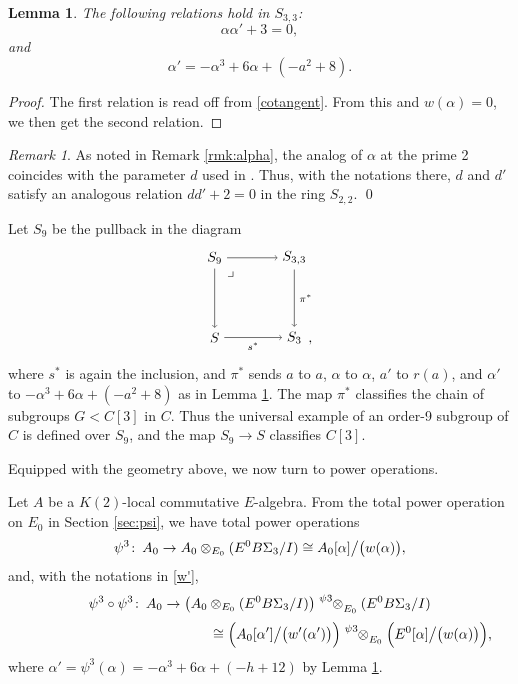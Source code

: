 \documentclass{gtpart}
\newtheorem{lem}[thm]{Lemma}
\theoremstyle{definition}
\theoremstyle{remark}
\newtheorem{rmk}[thm]{Remark}
\def\co{\colon\thinspace}
\newcommand{\A}{\alpha}
\newcommand{\p}{\psi^3}
\begin{document}
\begin{lem}
\label{lem:-p}
 The following relations hold in $S_{3,3}$: 
 \[
  \A \A' + 3 = 0, 
 \]
 and 
 \[
  \A' = -\A^3 + 6 \A + (-a^2 + 8).  
 \]
\end{lem}
\begin{proof}
 The first relation is read off from \eqref{cotangent}.  From this and $w(\A) = 0$, we then get the second relation.  
\end{proof}
\begin{rmk}
 As noted in Remark \ref{rmk:alpha}, the analog of $\A$ at the prime 2 coincides with the parameter $d$ used in \cite[Section 3]{h2p2}.  
 Thus, with the notations there, $d$ and $d'$ satisfy an analogous relation $d d' + 2 = 0$ in the ring $S_{2,2}$.  
\qed
\end{rmk}

Let $S_9$ be the pullback in the diagram 
\begin{equation}
\label{S9}
 \begin{tikzpicture}[baseline=(current bounding box.center)]
         \node (LT) at (0, 2) {$S_9$}; 
         \node (RT) at (2, 2) {$S_{3,3}$}; 
         \node (LB) at (0, 0) {$S$}; 
         \node (RB) at (2, 0) {$S_3$}; 
         \node at (2.4, -0.125) {,}; 
         \node at (0.4, 1.6) {$\lrcorner$}; 
         \draw [->] (LT) --  (RT); 
         \draw [->] (LT) --  (LB); 
         \draw [->] (RT) -- node [right] {$\scriptstyle \pi^*$} (RB); 
         \draw [->] (LB) -- node [below] {$\scriptstyle s^*$} (RB); 
 \end{tikzpicture}
\end{equation}
where $s^*$ is again the inclusion, and $\pi^*$ sends $a$ to $a$, $\A$ to $\A$, $a'$ to $r(a)$, and $\A'$ to $-\A^3 + 6 \A + (-a^2 + 8)$ as in Lemma \ref{lem:-p}.  
The map $\pi^*$ classifies the chain of subgroups $G < C[3]$ in $C$.  
Thus the universal example of an order-9 subgroup of $C$ is defined over $S_9$, and the map $S_9 \to S$ classifies $C[3]$.  

Equipped with the geometry above, we now turn to power operations.  

Let $A$ be a $K(2)$-local commutative $E$-algebra.  
From the total power operation on $E_0$ in Section \ref{sec:psi}, we have total power operations 
\[
 \p \co A_0 \to A_0 \otimes_{E_0} (E^0 B\Sigma_3 / I) \cong A_0 [\A] \big/ \big( w(\A) \big), 
\]
and, with the notations in \eqref{w'}, 
\[
 \p \circ \p \co A_0 \to \big( A_0 \otimes_{E_0} (E^0 B\Sigma_3 / I) \big) \tensor[^\p]{\otimes}{_{E_0}} (E^0 B\Sigma_3 / I) 
\]
\[
 ~~~~~~~~~~~~~~~~~~~~~~~~~~~~~~~~~~~~~~~~\cong \Big( A_0 [\A'] \big/ \big( w'(\A') \big) \Big) \tensor[^\p]{\otimes}{_{E_0}} \Big( E^0 [\A] \big/ \big( w(\A) \big) \Big), 
\]
where $\A' = \p(\A) = -\A^3 + 6 \A + (-h + 12)$ by Lemma \ref{lem:-p}.  
\end{document}
